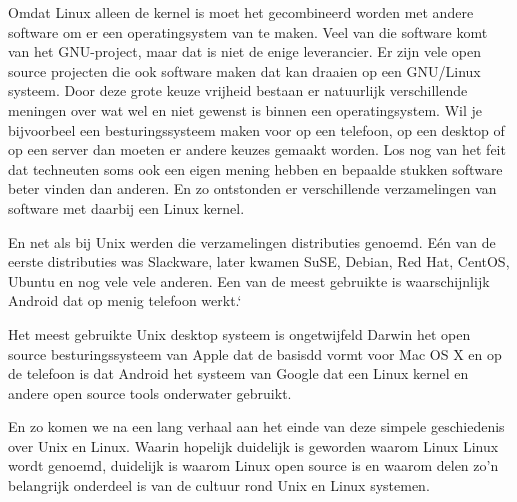 Omdat Linux alleen de kernel is moet het gecombineerd worden met andere software om er een operatingsystem van te maken. Veel van die software komt van het GNU-project, maar dat is niet de enige leverancier. Er zijn vele open source projecten die ook software maken dat kan draaien op een GNU/Linux systeem. Door deze grote keuze vrijheid bestaan er natuurlijk verschillende meningen over wat wel en niet gewenst is binnen een operatingsystem. Wil je bijvoorbeel een besturingssysteem maken voor op een telefoon, op een desktop of op een server dan moeten er andere keuzes gemaakt worden. Los nog van het feit dat techneuten soms ook een eigen mening hebben en bepaalde stukken software beter vinden dan anderen. En zo ontstonden er verschillende verzamelingen van software met daarbij een Linux kernel.

En net als bij Unix werden die verzamelingen distributies genoemd. E\'en van de eerste distributies was Slackware, later kwamen SuSE, Debian, Red Hat, CentOS, Ubuntu en nog vele vele anderen. Een van de meest gebruikte  is waarschijnlijk Android dat op menig telefoon werkt.`

Het meest gebruikte Unix desktop systeem is ongetwijfeld Darwin het open source besturingssysteem van Apple dat de basisdd
vormt voor Mac OS X en op de telefoon is dat Android het systeem van Google dat een Linux kernel en andere open source
tools onderwater gebruikt.\par

En zo komen we na een lang verhaal aan het einde van deze simpele geschiedenis over Unix en Linux. Waarin hopelijk duidelijk is geworden waarom Linux Linux wordt genoemd, duidelijk is waarom Linux open source is en waarom delen zo'n belangrijk onderdeel is van de cultuur rond Unix en Linux systemen.

